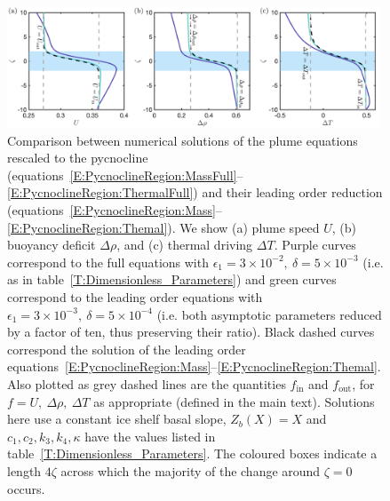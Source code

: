 \documentclass[openacc]{rsproca_new}%
\newcommand{\epsone}{\epsilon_{1}} %
\newcommand{\lt}{\delta} %
\renewcommand{\in}{\text{in}} %
\newcommand{\out}{\text{out}}
\begin{document}
\begin{figure}
\centering
\includegraphics[width = 0.99\textwidth]{Submitted_PRSA/make_plots/plots/figure4.pdf}
\caption{Comparison between numerical solutions of the plume equations rescaled to the pycnocline (equations~\eqref{E:PycnoclineRegion:MassFull}--\eqref{E:PycnoclineRegion:ThermalFull}) and their leading order reduction (equations~\eqref{E:PycnoclineRegion:Mass}--\eqref{E:PycnoclineRegion:Themal}). We show (a) plume speed $U$, (b) buoyancy deficit $\Delta \rho$, and (c) thermal driving $\Delta T$. Purple curves correspond to the full equations with $\epsone = 3\times10^{-2}, ~\lt = 5\times10^{-3}$ (i.e. as in table~\ref{T:Dimensionless_Parameters}) and green curves correspond to the leading order equations with $\epsone = 3\times10^{-3},~ \lt = 5\times10^{-4}$ (i.e. both asymptotic parameters reduced by a factor of ten, thus preserving their ratio). Black dashed curves correspond the solution of the leading order equations~\eqref{E:PycnoclineRegion:Mass}--\eqref{E:PycnoclineRegion:Themal}. Also plotted as grey dashed lines are the quantities $f_{\in}$ and $f_{\out}$, for $f = U,~ \Delta \rho, ~\Delta T$ as appropriate (defined in the main text). Solutions here use a constant ice shelf basal slope, $Z_b(X) = X$ and $c_1, c_2, k_3,k_4, \kappa$ have the values listed in table~\ref{T:Dimensionless_Parameters}. The coloured boxes indicate a length $4 \zeta$ across which the majority of the change around $\zeta = 0 $ occurs.}\label{fig:PycnoclineAsymptotics}
\end{figure}
\end{document}
